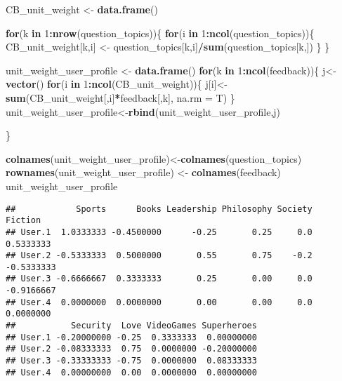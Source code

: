\documentclass[]{article}
\newenvironment{Shaded}{\begin{snugshade}}{\end{snugshade}}
\newcommand{\ControlFlowTok}[1]{\textcolor[rgb]{0.13,0.29,0.53}{\textbf{#1}}}
\newcommand{\DataTypeTok}[1]{\textcolor[rgb]{0.13,0.29,0.53}{#1}}
\newcommand{\DecValTok}[1]{\textcolor[rgb]{0.00,0.00,0.81}{#1}}
\newcommand{\KeywordTok}[1]{\textcolor[rgb]{0.13,0.29,0.53}{\textbf{#1}}}
\newcommand{\NormalTok}[1]{#1}
\newcommand{\OperatorTok}[1]{\textcolor[rgb]{0.81,0.36,0.00}{\textbf{#1}}}
\newcommand{\StringTok}[1]{\textcolor[rgb]{0.31,0.60,0.02}{#1}}
\begin{document}
\begin{Shaded}
\begin{Highlighting}[]
\NormalTok{CB_unit_weight <-}\StringTok{ }\KeywordTok{data.frame}\NormalTok{()}


\ControlFlowTok{for}\NormalTok{(k }\ControlFlowTok{in} \DecValTok{1}\OperatorTok{:}\KeywordTok{nrow}\NormalTok{(question_topics))\{}
  \ControlFlowTok{for}\NormalTok{(i }\ControlFlowTok{in} \DecValTok{1}\OperatorTok{:}\KeywordTok{ncol}\NormalTok{(question_topics))\{}
\NormalTok{    CB_unit_weight[k,i] <-}\StringTok{ }\NormalTok{question_topics[k,i]}\OperatorTok{/}\KeywordTok{sum}\NormalTok{(question_topics[k,]) }
\NormalTok{  \}}
\NormalTok{\}}

\NormalTok{unit_weight_user_profile <-}\StringTok{ }\KeywordTok{data.frame}\NormalTok{()}
\ControlFlowTok{for}\NormalTok{(k }\ControlFlowTok{in} \DecValTok{1}\OperatorTok{:}\KeywordTok{ncol}\NormalTok{(feedback))\{}
\NormalTok{  j<-}\StringTok{ }\KeywordTok{vector}\NormalTok{()}
  \ControlFlowTok{for}\NormalTok{(i }\ControlFlowTok{in} \DecValTok{1}\OperatorTok{:}\KeywordTok{ncol}\NormalTok{(CB_unit_weight))\{}
\NormalTok{    j[i]<-}\StringTok{ }\KeywordTok{sum}\NormalTok{(CB_unit_weight[,i]}\OperatorTok{*}\NormalTok{feedback[,k], }\DataTypeTok{na.rm =}\NormalTok{ T)}
\NormalTok{  \}}
\NormalTok{  unit_weight_user_profile<-}\KeywordTok{rbind}\NormalTok{(unit_weight_user_profile,j)}
  
\NormalTok{\}}

\KeywordTok{colnames}\NormalTok{(unit_weight_user_profile)<-}\KeywordTok{colnames}\NormalTok{(question_topics)}
\KeywordTok{rownames}\NormalTok{(unit_weight_user_profile) <-}\StringTok{ }\KeywordTok{colnames}\NormalTok{(feedback)}
\NormalTok{unit_weight_user_profile}
\end{Highlighting}
\end{Shaded}

\begin{verbatim}
##            Sports      Books Leadership Philosophy Society    Fiction
## User.1  1.0333333 -0.4500000      -0.25       0.25     0.0  0.5333333
## User.2 -0.5333333  0.5000000       0.55       0.75    -0.2 -0.5333333
## User.3 -0.6666667  0.3333333       0.25       0.00     0.0 -0.9166667
## User.4  0.0000000  0.0000000       0.00       0.00     0.0  0.0000000
##           Security  Love VideoGames Superheroes
## User.1 -0.20000000 -0.25  0.3333333  0.00000000
## User.2 -0.08333333  0.75  0.0000000 -0.20000000
## User.3 -0.33333333 -0.75  0.0000000  0.08333333
## User.4  0.00000000  0.00  0.0000000  0.00000000
\end{verbatim}
\end{document}
